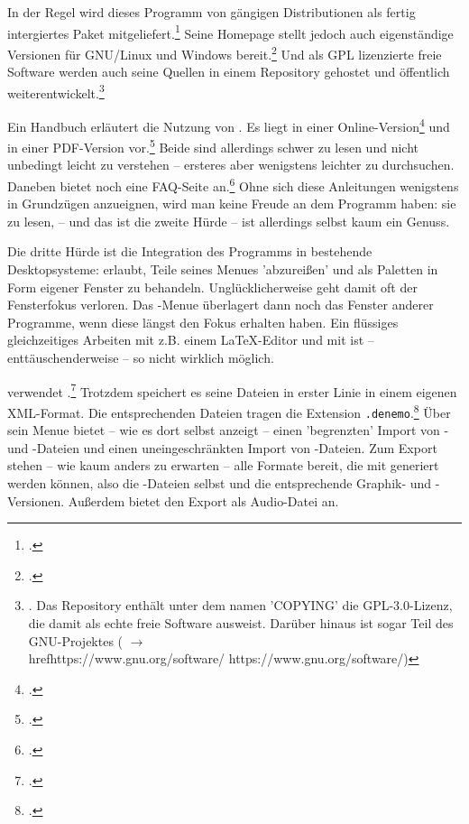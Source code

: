 In der Regel wird dieses Programm von gängigen Distributionen als fertig
intergiertes Paket mitgeliefert.\footcite[vgl. z.B.][\nopage
wp.]{UbuntuDenemo2014a} Seine Homepage stellt jedoch auch eigenständige
Versionen für GNU/Linux und Windows bereit.\footcite[vgl.][\nopage
wp.]{Denemo2019d} Und als GPL lizenzierte freie Software werden auch seine
Quellen in einem Repository gehostet und öffentlich
weiterentwickelt.\footnote{\cite[vgl.][\nopage wp.]{GithubDenemo2019a}.
Das Repository enthält unter dem namen 'COPYING' die GPL-3.0-Lizenz, die
 damit als echte freie Software ausweist. Darüber hinaus ist
 sogar Teil des GNU-Projektes ( $\rightarrow$
\\href{https://www.gnu.org/software/} {https://www.gnu.org/software/})}

Ein Handbuch erläutert die Nutzung von . Es liegt in einer
Online-Version\footcite[vgl.][\nopage wp.]{Shann2015a} und in einer
PDF-Version vor.\footcite[vgl.][2ff]{Shann2015b} Beide sind allerdings schwer zu
lesen und nicht unbedingt leicht zu verstehen -- ersteres aber wenigstens leichter
zu durchsuchen. Daneben bietet  noch eine FAQ-Seite
an.\footcite[vgl.][\nopage wp.]{Denemo2019c} Ohne sich diese Anleitungen
wenigstens in Grundzügen anzueignen, wird man keine Freude an dem Programm
haben: sie zu lesen, -- und das ist die zweite Hürde -- ist allerdings selbst
kaum ein Genuss.

Die dritte Hürde ist die Integration des Programms in bestehende Desktopsysteme:
 erlaubt, Teile seines Menues 'abzureißen' und als Paletten in Form
eigener Fenster zu behandeln. Unglücklicherweise geht damit oft der Fensterfokus
verloren. Das -Menue überlagert dann noch das Fenster anderer
Programme, wenn diese längst den Fokus erhalten haben. Ein flüssiges
gleichzeitiges Arbeiten mit z.B. einem \LaTeX-Editor und mit  ist
-- enttäuschenderweise -- so nicht wirklich möglich.

 verwendet .\footcite[vgl.][\nopage
wp.]{Denemo2019b} Trotzdem speichert es seine Dateien in erster Linie in einem
eigenen XML-Format. Die entsprechenden Dateien tragen die Extension
\texttt{.denemo}.\footcite[vgl. dazu][\nopage wp.]{WpedDenemo2018a} Über sein
Menue bietet  -- wie es dort selbst anzeigt -- einen 'begrenzten'
Import von - und -Dateien und einen uneingeschränkten
Import von -Dateien. Zum Export stehen -- wie kaum anders zu
erwarten -- alle Formate bereit, die mit  generiert werden können,
also die -Dateien selbst und die entsprechende Graphik- und
-Versionen. Außerdem bietet  den Export als Audio-Datei an.


